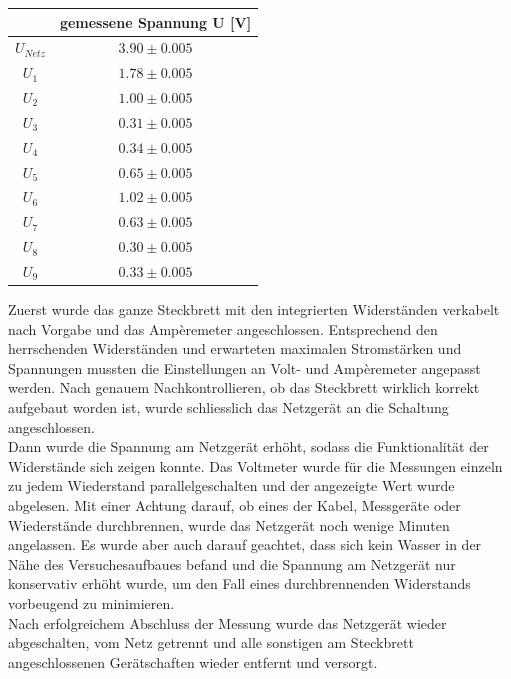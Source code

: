 \documentclass[a4paper,12pt]{article}
\begin{document}
\begin{table}[H]
    \centering
    \begin{tabular}{|c|c|}
        \hline
         & \textbf{gemessene Spannung U [V]}\\
        \hline
        $U_{Netz}$ & $3.90\pm 0.005$\\
        \hline
        $U_1$ & $1.78\pm 0.005$\\
        \hline
        $U_2$ & $1.00\pm 0.005$\\
        \hline
        $U_3$ & $0.31\pm 0.005$\\
        \hline
        $U_4$ & $0.34\pm 0.005$\\
        \hline
        $U_5$ & $0.65\pm 0.005$\\
        \hline
        $U_6$ & $1.02\pm 0.005$\\
        \hline
        $U_7$ & $0.63\pm 0.005$\\
        \hline
        $U_8$ & $0.30\pm 0.005$\\
        \hline
        $U_9$ & $0.33\pm 0.005$\\
        \hline
    \end{tabular}
\end{table}

Zuerst wurde das ganze Steckbrett mit den integrierten Widerständen verkabelt nach Vorgabe und das Ampèremeter angeschlossen. Entsprechend den herrschenden Widerständen und erwarteten maximalen Stromstärken und Spannungen mussten die Einstellungen an Volt- und Ampèremeter angepasst werden. Nach genauem Nachkontrollieren, ob das Steckbrett wirklich korrekt aufgebaut worden ist, wurde schliesslich das Netzgerät an die Schaltung angeschlossen. \\

Dann wurde die Spannung am Netzgerät erhöht, sodass die Funktionalität der Widerstände sich zeigen konnte. Das Voltmeter wurde für die Messungen einzeln zu jedem Wiederstand parallelgeschalten und der angezeigte Wert wurde abgelesen. Mit einer Achtung darauf, ob eines der Kabel, Messgeräte oder Wiederstände durchbrennen, wurde das Netzgerät noch wenige Minuten angelassen. Es wurde aber auch darauf geachtet, dass sich kein Wasser in der Nähe des Versuchesaufbaues befand und die Spannung am Netzgerät nur konservativ erhöht wurde, um den Fall eines durchbrennenden Widerstands vorbeugend zu minimieren.\\

Nach erfolgreichem Abschluss der Messung wurde das Netzgerät wieder abgeschalten, vom Netz getrennt und alle sonstigen am Steckbrett angeschlossenen Gerätschaften wieder entfernt und versorgt.
\end{document}
